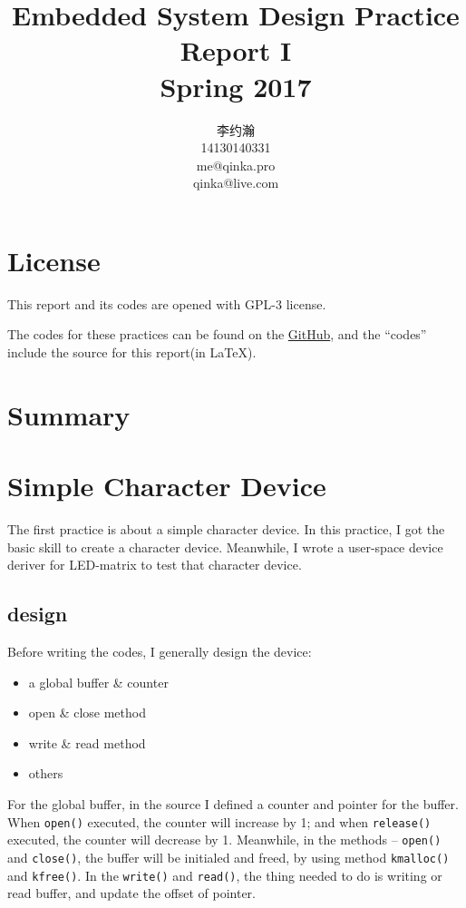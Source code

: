\documentclass{report}
\title{Embedded System Design Practice Report I \\ Spring 2017}
\author{李约瀚 \\ 14130140331 \\ me@qinka.pro \\ qinka@live.com}
\begin{document}
    \maketitle
    \tableofcontents
    
    \chapter{License}
    \label{chap:license}
    This report and its codes are opened with GPL-3 license.
    
    The codes for these practices can be found on the%
    \href{https://github.com/Qinka/embedded-system-design-homework}{GitHub},
    and the ``codes'' include the source for this report(in \LaTeX).
    
    \chapter{Summary}
    \label{chap:summary}
    
    \chapter{Simple Character Device}
    \label{chap:scd}
    
    The first practice is about a simple character device. In this practice, I got the
    basic skill to create a character device. Meanwhile, I wrote a user-space device deriver for LED-matrix to test
    that character device.
    
    \section{design}
    \label{chap:scd:design}
    
    Before writing the codes, I generally design the device:
    \begin{itemize}
        \item a global buffer \& counter
        \item open \& close method
        \item write \& read method
        \item others
    \end{itemize}
    
    For the global buffer, in the source I defined a counter and pointer for the buffer. When \lstinline|open()| executed,
    the counter will increase by 1; and when \lstinline|release()| executed, the counter will decrease by 1. 
    Meanwhile, in the methods -- \lstinline|open()| and \lstinline|close()|, the buffer will be initialed and 
    freed, by using method \lstinline|kmalloc()| and \lstinline|kfree()|. 
    In the \lstinline|write()| and \lstinline|read()|, the thing needed to do is writing or read buffer,
    and update the offset of pointer.
    
\end{document}

